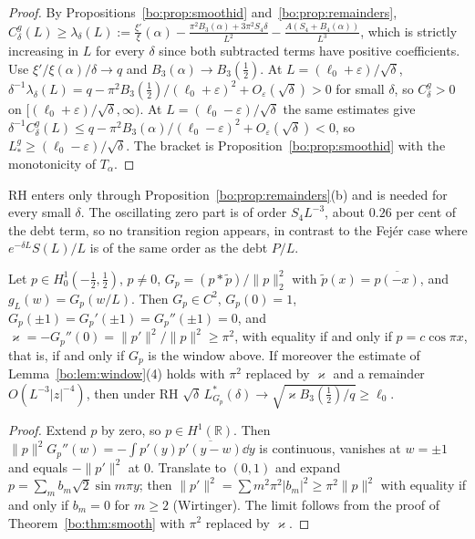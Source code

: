 \begin{proof}
By Propositions~\ref{bo:prop:smoothid} and~\ref{bo:prop:remainders}, $C^g_\delta(L)\ge\lambda_\delta(L):=\frac{\xi'}{\xi}(\alpha)-\frac{\pi^2B_3(\alpha)+3\pi^2S_4\delta}{L^2}-\frac{A(S_4+B_4(\alpha))}{L^3}$, which is strictly increasing in $L$ for every $\delta$ since both subtracted terms have positive coefficients. Use $\xi'/\xi(\alpha)/\delta\to q$ and $B_3(\alpha)\to B_3(\frac12)$. At $L=(\ell_0+\varepsilon)/\sqrt\delta$, $\delta^{-1}\lambda_\delta(L)=q-\pi^2B_3(\frac12)/(\ell_0+\varepsilon)^2+O_\varepsilon(\sqrt\delta)>0$ for small $\delta$, so $C^g_\delta>0$ on $[(\ell_0+\varepsilon)/\sqrt\delta,\infty)$. At $L=(\ell_0-\varepsilon)/\sqrt\delta$ the same estimates give $\delta^{-1}C^g_\delta(L)\le q-\pi^2B_3(\alpha)/(\ell_0-\varepsilon)^2+O_\varepsilon(\sqrt\delta)<0$, so $L^g_*\ge(\ell_0-\varepsilon)/\sqrt\delta$. The bracket is Proposition~\ref{bo:prop:smoothid} with the monotonicity of $T_\alpha$.
\end{proof}

RH enters only through Proposition~\ref{bo:prop:remainders}(b) and is needed for every small $\delta$. The oscillating zero part is of order $S_4L^{-3}$, about $0.26$ per cent of the debt term, so no transition region appears, in contrast to the Fej\'er case where $e^{-\delta L}S(L)/L$ is of the same order as the debt $P/L$.

\begin{proposition}\label{bo:prop:poincare}
Let $p\in H^1_0(-\frac12,\frac12)$, $p\ne0$, $G_p=(p*\tilde p)/\|p\|_2^2$ with $\tilde p(x)=\overline{p(-x)}$, and $g_L(w)=G_p(w/L)$. Then $G_p\in C^2$, $G_p(0)=1$, $G_p(\pm1)=G_p'(\pm1)=G_p''(\pm1)=0$, and $\varkappa=-G_p''(0)=\|p'\|^2/\|p\|^2\ge\pi^2$, with equality if and only if $p=c\cos\pi x$, that is, if and only if $G_p$ is the window above. If moreover the estimate of Lemma~\ref{bo:lem:window}(4) holds with $\pi^2$ replaced by $\varkappa$ and a remainder $O(L^{-3}|z|^{-4})$, then under RH $\sqrt\delta\,L^*_{G_p}(\delta)\to\sqrt{\varkappa B_3(\frac12)/q}\ge\ell_0$.
\end{proposition}

\begin{proof}
Extend $p$ by zero, so $p\in H^1(\mathbb R)$. Then $\|p\|^2G_p''(w)=-\int p'(y)\overline{p'(y-w)}\dd y$ is continuous, vanishes at $w=\pm1$ and equals $-\|p'\|^2$ at $0$. Translate to $(0,1)$ and expand $p=\sum_mb_m\sqrt2\sin m\pi y$; then $\|p'\|^2=\sum m^2\pi^2|b_m|^2\ge\pi^2\|p\|^2$ with equality if and only if $b_m=0$ for $m\ge2$ (Wirtinger). The limit follows from the proof of Theorem~\ref{bo:thm:smooth} with $\pi^2$ replaced by $\varkappa$.
\end{proof}

